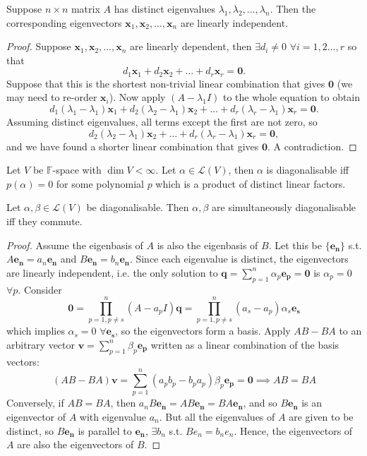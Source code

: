 \documentclass[a4paper]{article}
\begin{document}
\begin{thm}
  Suppose $n\times n$ matrix $A$ has distinct eigenvalues $\lambda_1, \lambda_2, \dots, \lambda_n$. Then the corresponding eigenvectors $\mathbf{x}_1, \mathbf{x}_2, \dots, \mathbf{x}_n$ are linearly independent.
\end{thm}
\begin{proof}
Suppose $\mathbf{x}_1, \mathbf{x}_2, \dots, \mathbf{x}_n$ are linearly dependent, then $\exists d_i\neq 0$ $\forall i=1,2\dots,r$ so that
  \[
    d_1\mathbf{x}_1 + d_2\mathbf{x}_2 + \dots + d_r\mathbf{x}_r = \mathbf{0}.
  \]
  Suppose that this is the shortest non-trivial linear combination that gives $\mathbf{0}$ (we may need to re-order $\mathbf{x}_i$).  Now apply $(A - \lambda_1 I)$ to the whole equation to obtain
  \[
    d_1(\lambda_1 - \lambda_1)\mathbf{x}_1 + d_2(\lambda_2 - \lambda_1)\mathbf{x}_2 + \dots + d_r(\lambda_r - \lambda_1)\mathbf{x}_r = \mathbf{0}.
  \]
  Assuming distinct eigenvalues, all terms except the first are not zero, so
  \[
    d_2(\lambda_2 - \lambda_1)\mathbf{x}_2 + \dots + d_r(\lambda_r - \lambda_1)\mathbf{x}_r = \mathbf{0},
  \]
  and we have found a shorter linear combination that gives $\mathbf{0}$. A contradiction.
  \end{proof}
\begin{thm}
Let $V$ be $\mathbb{F}$-space with $\dim V<\infty$. Let $\alpha\in\mathcal{L}(V)$, then $\alpha$ is diagonalisable iff $p(\alpha)=0$ for some polynomial $p$ which is a product of distinct linear factors.
\end{thm}
\begin{thm}
Let $\alpha,\beta\in\mathcal{L}(V)$ be diagonalisable. Then $\alpha,\beta$ are simultaneously diagonalisable iff they commute.
\end{thm}
\begin{proof}
Assume the eigenbasis of $A$ is also the eigenbasis of $B$. Let this be $\{\mathbf{e_n}\}$ s.t. $A\mathbf{e_n}=a_n\mathbf{e_n}$ and $B\mathbf{e_n}=b_n\mathbf{e_n}$. Since each eigenvalue is distinct, the eigenvectors are linearly independent, i.e. the only solution to $\mathbf{q}=\sum_{p=1}^n\alpha_p\mathbf{e_p}=\boldsymbol{0}$ is $\alpha_p=0$ $\forall p$. Consider
$$\boldsymbol{0}=\prod_{p=1,p\neq s}^n(A-a_pI)\mathbf{q}=\prod_{p=1,p\neq s}^n(a_s-a_p)\alpha_s\mathbf{e_s}$$
which implies $\alpha_s=0$ $\forall\mathbf{e_s}$, so the eigenvectors form a basis. Apply $AB-BA$ to an arbitrary vector $\mathbf{v}=\sum_{p=1}^n\beta_p\mathbf{e_p}$ written as a linear combination of the basis vectors:
$$(AB-BA)\mathbf{v}=\sum_{p=1}^n(a_pb_p-b_pa_p)\beta_p\mathbf{e_p}=\boldsymbol{0}\implies AB=BA$$
Conversely, if $AB=BA$, then $a_nB\mathbf{e_n}=AB\mathbf{e_n}=BA\mathbf{e_n}$, and so $B\mathbf{e_n}$ is an eigenvector of $A$ with eigenvalue $a_n$. But all the eigenvalues of $A$ are given to be distinct, so $B\mathbf{e_n}$ is parallel to $\mathbf{e_n}$, $\exists b_n$ s.t. $Be_n=b_ne_n$. Hence, the eigenvectors of $A$ are also the eigenvectors of $B$.
\end{proof}
\end{document}
